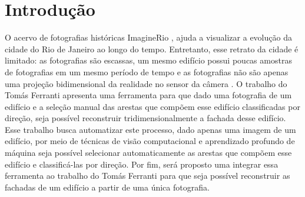 \documentclass[12pt]{article}
\begin{document}








\newpage

\section{Introdução}

O acervo de fotografias históricas ImagineRio \cite{imagineRio}, ajuda a visualizar a evolução da cidade do Rio de Janeiro ao longo do tempo. Entretanto, esse retrato da cidade é limitado: as fotografias são escassas, um mesmo edifício possui poucas amostras de fotografias em um mesmo período de tempo e as fotografias não são apenas uma projeção bidimensional da realidade no sensor da câmera \cite{Hartley2004}. O trabalho do Tomás Ferranti \cite{Ferranti2021} apresenta uma ferramenta para que dado uma fotografia de um edifício e a seleção manual das arestas que compõem esse edifício classificadas por direção, seja possível reconstruir tridimensionalmente a fachada desse edifício. Esse trabalho busca automatizar este processo, dado apenas uma imagem de um edifício, por meio de técnicas de visão computacional e aprendizado profundo de máquina seja possível selecionar automaticamente as arestas que compõem esse edifício e classificá-las por direção. Por fim, será proposto uma integrar essa ferramenta ao trabalho do Tomás Ferranti \cite{Ferranti2021} para que seja possível reconstruir as fachadas de um edifício a partir de uma única fotografia.
\end{document}
